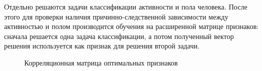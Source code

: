 \documentclass[12pt, twoside]{article}
\begin{document}
Отдельно решаются задачи классификации активности и пола человека. После этого для проверки наличия причинно-следственной зависимости между активностью и полом производится обучения на расширенной матрице признаков: сначала решается одна задача классификации, а потом полученный вектор решения используется как признак для решения второй задачи.

\begin{table}[H]
\caption{Среднее и дисперсия доли верных классификаций}
\begin{table}[H]
\centering
{}
\end{table}

\end{table}


\begin{figure}[H]
\caption{ Корреляционная матрица оптимальных признаков}
\label{fig:image}
\end{figure}
\end{document}

